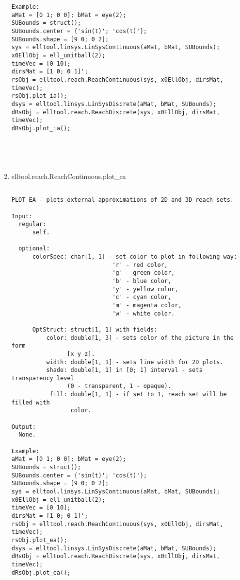 \begin{enumerate}
\begin{lstlisting}
Example:
aMat = [0 1; 0 0]; bMat = eye(2);
SUBounds = struct();
SUBounds.center = {'sin(t)'; 'cos(t)'};
SUBounds.shape = [9 0; 0 2];
sys = elltool.linsys.LinSysContinuous(aMat, bMat, SUBounds);
x0EllObj = ell_unitball(2);
timeVec = [0 10];
dirsMat = [1 0; 0 1]';
rsObj = elltool.reach.ReachContinuous(sys, x0EllObj, dirsMat, timeVec);
rsObj.plot_ia();
dsys = elltool.linsys.LinSysDiscrete(aMat, bMat, SUBounds);
dRsObj = elltool.reach.ReachDiscrete(sys, x0EllObj, dirsMat, timeVec);
dRsObj.plot_ia();





\end{lstlisting}
\fontfamily{\familydefault}
\selectfont
\item {elltool.reach.ReachContinuous.plot\_ea}
\selectfont
\begin{lstlisting}

PLOT_EA - plots external approximations of 2D and 3D reach sets.

Input:
  regular:
      self.

  optional:
      colorSpec: char[1, 1] - set color to plot in following way:
                             'r' - red color,
                             'g' - green color,
                             'b' - blue color,
                             'y' - yellow color,
                             'c' - cyan color,
                             'm' - magenta color,
                             'w' - white color.

      OptStruct: struct[1, 1] with fields:
          color: double[1, 3] - sets color of the picture in the form
                [x y z].
          width: double[1, 1] - sets line width for 2D plots.
          shade: double[1, 1] in [0; 1] interval - sets transparency level
                (0 - transparent, 1 - opaque).
           fill: double[1, 1] - if set to 1, reach set will be filled with
                 color.

Output:
  None.

Example:
aMat = [0 1; 0 0]; bMat = eye(2);
SUBounds = struct();
SUBounds.center = {'sin(t)'; 'cos(t)'};
SUBounds.shape = [9 0; 0 2];
sys = elltool.linsys.LinSysContinuous(aMat, bMat, SUBounds);
x0EllObj = ell_unitball(2);
timeVec = [0 10];
dirsMat = [1 0; 0 1]';
rsObj = elltool.reach.ReachContinuous(sys, x0EllObj, dirsMat, timeVec);
rsObj.plot_ea();
dsys = elltool.linsys.LinSysDiscrete(aMat, bMat, SUBounds);
dRsObj = elltool.reach.ReachDiscrete(sys, x0EllObj, dirsMat, timeVec);
dRsObj.plot_ea();






\end{lstlisting}
\end{enumerate}
